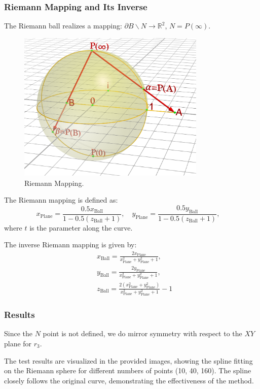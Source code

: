\documentclass{article}
\begin{document}
\subsubsection{Riemann Mapping and Its Inverse}
The Riemann ball realizes a mapping: \(\partial B \backslash N \rightarrow \mathbb{R}^2\), \(N = P(\infty)\).\par

\begin{figure}[H]
    \centering
    \includegraphics[width=0.8\textwidth]{../figure/RiemannBall.png}
    \caption{Riemann Mapping.}
    \label{fig:Riemann}
\end{figure}

The Riemann mapping is defined as:
\[
x_{\text{Plane}} = \frac{0.5x_{\text{Ball}}}{1 - 0.5(z_{\text{Ball}} + 1)}, \quad
y_{\text{Plane}} = \frac{0.5y_{\text{Ball}}}{1 - 0.5(z_{\text{Ball}} + 1)}, \quad
\]
where \( t \) is the parameter along the curve.

The inverse Riemann mapping is given by:
\begin{align*}
    &x_{\text{Ball}} = \frac{2x_{\text{Plane}}}{x_{\text{Plane}}^2 + y_{\text{Plane}}^2 + 1}, \\
    &y_{\text{Ball}} = \frac{2y_{\text{Plane}}}{x_{\text{Plane}}^2 + y_{\text{Plane}}^2 + 1}, \\
    &z_{\text{Ball}} = \frac{2(x_{\text{Plane}}^2 + y_{\text{Plane}}^2)}{x_{\text{Plane}}^2 + y_{\text{Plane}}^2 + 1} - 1  
\end{align*}

\subsubsection{Results}
Since the \(N\) point is not defined, we do mirror symmetry with respect to the \(XY\) plane for \(r_3\).\par
The test results are visualized in the provided images, showing the spline fitting on the Riemann sphere for different numbers of points (10, 40, 160). The spline closely follows the original curve, demonstrating the effectiveness of the method.
\end{document}
